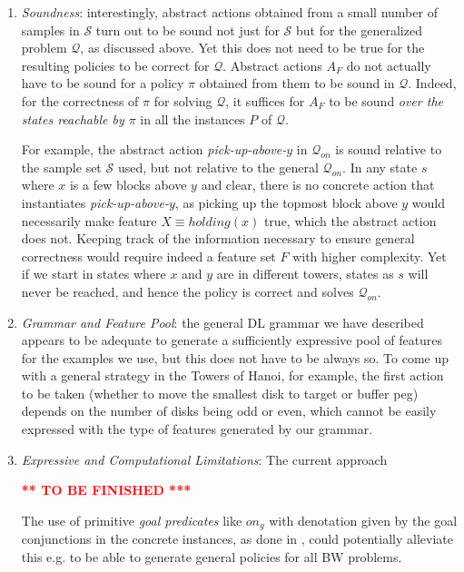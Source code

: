 \documentclass[letterpaper]{article} %
\newcommand{\alert}[1]{\textcolor{red}{\bf #1}}
\newcommand{\Q}{\mathcal{Q}}
\begin{document}
\begin{enumerate}
\item
\emph{Soundness}: interestingly, abstract actions obtained from a small number of samples in
$\mathcal{S}$ turn out to be sound not just for $\mathcal{S}$ but for the generalized problem $\Q$,
as discussed above. Yet this does not need to be true for the resulting policies to be
correct for $\Q$.
%
Abstract actions $A_F$ do not actually have to be sound for a policy $\pi$
obtained from them to be sound in $\Q$.
Indeed, for the correctness of $\pi$ for solving $\Q$,
it suffices for $A_F$ to be sound \emph{over the states reachable by $\pi$}
in all the instances $P$ of $\Q$.

For example, the abstract action \emph{pick-up-above-$y$} in $\Q_{on}$
is sound relative to the sample set $\mathcal{S}$ used, but not relative to the general
$\Q_{on}$. In any state $s$ where $x$ is a few blocks above $y$ and clear,
there is no concrete action that instantiates \emph{pick-up-above-$y$},
as picking up the topmost block above $y$ would necessarily make feature $X \equiv holding(x)$
true, which the abstract action does not.
%
Keeping track of the information necessary to ensure general correctness would require indeed
a feature set $F$ with higher complexity.
Yet if we start in states where $x$ and $y$ are in different towers,
states as $s$ will never be reached, and hence the policy is correct and solves $\Q_{on}$.


\item
\emph{Grammar and Feature Pool}: the general DL grammar we have described appears to be
adequate to generate a sufficiently expressive pool of features for the examples we use,
but this does not have to be always so.
To come up with a general strategy in the Towers of Hanoi, for example,
the first action to be taken  (whether to move the smallest disk to target or buffer peg)
depends on the number of disks being odd or even,
which cannot be easily expressed with the type of features generated by our grammar.

\item
\emph{Expressive and Computational Limitations}:
The current approach

\alert{*** TO BE FINISHED ***}

The use of primitive \emph{goal predicates} like $on_g$ with denotation
given by the goal conjunctions in the concrete instances, as done in
\cite{martin-geffner:generalized}, could potentially alleviate this
e.g. to be able to generate general policies for all BW problems.



\end{enumerate}
\end{document}

